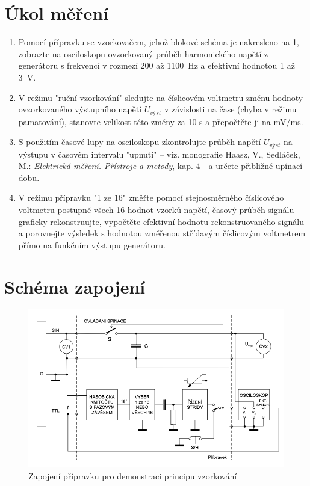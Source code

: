 \documentclass[a4paper,12pt]{article}   %
\begin{document}
\section{Úkol měření}
\label{chap:ukol}
\begin{enumerate}
    \item Pomocí přípravku se vzorkovačem, jehož blokové schéma je nakresleno na \ref{fig:zapojeni}, zobrazte na osciloskopu ovzorkovaný průběh harmonického napětí z generátoru s frekvencí v rozmezí 200 až 1100~Hz a efektivní hodnotou 1 až 3~V.
    \item V režimu "ruční vzorkování" sledujte na číslicovém voltmetru změnu hodnoty ovzorkovaného výstupního napětí $U_{výst}$ v závislosti na čase (chyba v režimu pamatování), stanovte velikost této změny za 10 s a přepočtěte ji na mV/ms.
    \item S použitím časové lupy na osciloskopu zkontrolujte průběh napětí $U_{výst}$ na výstupu v časovém intervalu "upnutí" – viz. monografie Haasz, V., Sedláček, M.: \textit{Elektrická měření. Přístroje a metody}, kap. 4 - a určete přibližně upínací dobu.
    \item V režimu přípravku "1 ze 16" změřte pomocí stejnosměrného číslicového voltmetru postupně všech 16 hodnot vzorků napětí, časový průběh signálu graficky rekonstruujte, vypočtěte efektivní hodnotu rekonstruovaného signálu a porovnejte výsledek s hodnotou změřenou střídavým číslicovým voltmetrem přímo na funkčním výstupu generátoru.
    
\end{enumerate}

\section{Schéma zapojení}
\label{chap:schema_zapojeni}
\begin{figure}[h!]
  \centering
  \includegraphics[width=.6\textwidth]{schema_zapojeni.png}
  \caption{Zapojení přípravku pro demonstraci principu vzorkování}
  \label{fig:zapojeni}
\end{figure}
\end{document}
